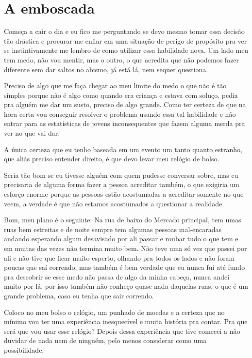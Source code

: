 \chapter{A emboscada}


Começa a cair o dia e eu fico me perguntando se devo mesmo tomar essa decisão tão drástica e procurar me enfiar em uma situação de perigo de propósito pra ver se instintivamente me lembro de como utilizar essa habilidade nova. Um lado meu tem medo, não vou mentir, mas o outro, o que acredita que não podemos fazer diferente sem dar saltos no abismo, já está lá, nem sequer questiona.

Preciso de algo que me faça chegar ao meu limite do medo o que não é tão simples porque não é algo como quando era criança e estava com soluço, pedia pra alguém me dar um susto, preciso de algo grande. Como ter certeza de que na hora certa vou conseguir resolver o problema usando essa tal habilidade e não entrar para as estatísticas de jovens inconsequentes que fazem alguma merda pra ver no que vai dar.

A única certeza que eu tenho baseada em um evento um tanto quanto estranho, que aliás preciso entender direito, é que devo levar meu relógio de bolso.

Seria tão bom se eu tivesse alguém com quem pudesse conversar sobre, mas eu precisaria de alguma forma fazer a pessoa acreditar também, o que exigiria um esforço enorme porque as pessoas estão acostumadas a acreditar somente no que veem, a verdade é que não estamos acostumados a questionar a realidade.

Bom, meu plano é o seguinte: Na rua de baixo do Mercado principal, tem umas ruas bem estreitas e de noite sempre tem algumas pessoas mal-encaradas andando esperando algum desavisado por ali passar e roubar tudo o que tem e em muitas das vezes não termina muito bem. Não teve uma só vez que passei por ali e não tive que ficar muito esperto, olhando pra todos os lados e não foram poucas que saí correndo, mas também é bem verdade que eu nunca fui até fundo pra descobrir se esse medo não passa de algo da minha cabeça, nunca andei muito por lá, por isso também não conheço quase nada daquelas ruas, o que é um grande problema, caso eu tenha que sair correndo.

Coloco no meu bolso o relógio, um punhado de moedas e a certeza que no mínimo vou ter uma experiência inesquecível e muita história pra contar. Pra que será que vou usar esse relógio? Depois dessa experiência que tive comecei a não duvidar de nada nem de ninguém, pelo menos considerar como uma possibilidade.

